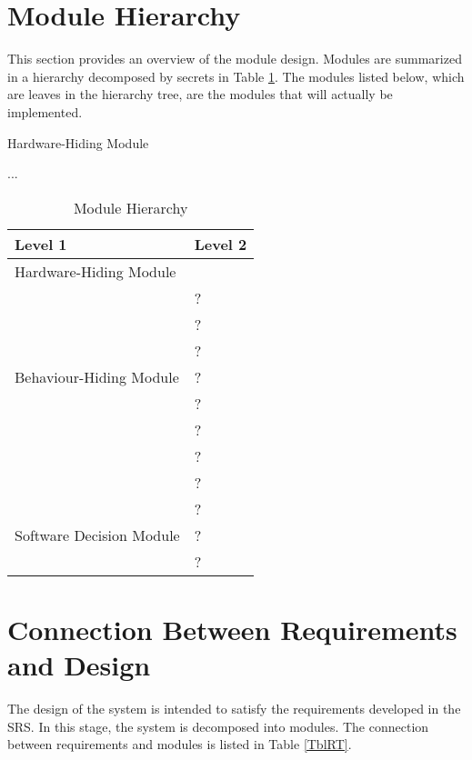 \documentclass[12pt, titlepage]{article}
\newcounter{mnum}
\newcommand{\mthemnum}{M\themnum}
\begin{document}
\section{Module Hierarchy} \label{SecMH}

This section provides an overview of the module design. Modules are summarized
in a hierarchy decomposed by secrets in Table \ref{TblMH}. The modules listed
below, which are leaves in the hierarchy tree, are the modules that will
actually be implemented.

\begin{description}
\item [ \mthemnum \label{mHH}:] Hardware-Hiding Module
\item ...
\end{description}


\begin{table}[h!]
\centering
\begin{tabular}{p{} p{}}
\toprule
\textbf{Level 1} & \textbf{Level 2}\\
\midrule

{Hardware-Hiding Module} & ~ \\
\midrule

\multirow{7}{0.3\textwidth}{Behaviour-Hiding Module} & ?\\
& ?\\
& ?\\
& ?\\
& ?\\
& ?\\
& ?\\ 
& ?\\
\midrule

\multirow{3}{0.3\textwidth}{Software Decision Module} & {?}\\
& ?\\
& ?\\
\bottomrule

\end{tabular}
\caption{Module Hierarchy}
\label{TblMH}
\end{table}

\section{Connection Between Requirements and Design} \label{SecConnection}

The design of the system is intended to satisfy the requirements developed in
the SRS. In this stage, the system is decomposed into modules. The connection
between requirements and modules is listed in Table \ref{TblRT}.
\end{document}
